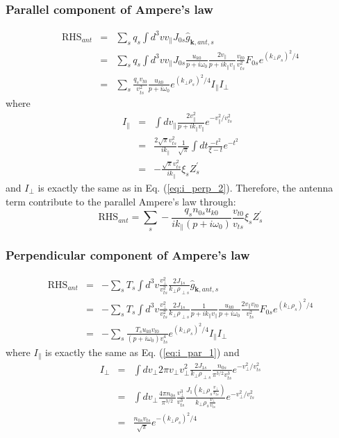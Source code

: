 \documentclass[12pt]{article}
\begin{document}
\subsubsection{Parallel component of Ampere's law}
\begin{eqnarray}
\mathrm{RHS}_{ant} &=& \sum_s q_s \int d^3 v v_\parallel  J_{0s} \hat{g}_{\mathbf{k}, ant, s} \nonumber \\
&=& \sum_s q_s \int d^3 v v_\parallel J_{0s} \frac{u_{k0}}{p + i\omega_0} \frac{2v_\parallel}{p + i k_\parallel v_\parallel} \frac{v_{t0}}{v_{ts}^2} F_{0s} e^{(k_\perp \rho_s)^2/4} \nonumber \\
&=& \sum_s \frac{q_s v_{t0}}{v_{ts}^2} \frac{u_{k0}}{p + i\omega_0} e^{(k_\perp \rho_s)^2/4} I_\parallel I_\perp
\end{eqnarray}
where
\begin{eqnarray}
I_\parallel &=& \int dv_\parallel \frac{2 v_\parallel^2}{p + ik_\parallel v_\parallel} e^{-v_\parallel^2/v_{ts}^2} \nonumber \\
&=& \frac{2\sqrt{\pi}v_{ts}^2}{ik_\parallel} \frac{1}{\sqrt{\pi}}\int dt \frac{-t^2}{\xi-t} e^{-t^2} \nonumber \\
&=& -\frac{\sqrt{\pi}v_{ts}^2}{ik_\parallel} \xi_s Z^\prime_s  
\end{eqnarray}
and $I_\perp$ is exactly the same as in Eq. (\ref{eq:i_perp_2}). Therefore, the antenna term contribute to the parallel Ampere's law through:
\begin{equation}
\mathrm{RHS}_{ant} = \sum_s - \frac{q_s n_{0s} u_{k0}}{ik_\parallel(p + i\omega_0)} \frac{v_{t0}}{v_{ts}} \xi_s Z^\prime_s
\end{equation}

\subsubsection{Perpendicular component of Ampere's law}
\begin{eqnarray}
\mathrm{RHS}_{ant} &=&  -\sum_s T_s \int d^3 v \frac{v_\perp^2}{v_{ts}^2} \frac{2J_{1s}}{k_\perp \rho_{\perp s}} \hat{g}_{\mathbf{k}, ant, s} \nonumber \\
&=& -\sum_s T_s \int d^3 v \frac{v_\perp^2}{v_{ts}^2} \frac{2J_{1s}}{k_\perp \rho_{\perp s}} \frac{1}{p + ik_\parallel v_\parallel} \frac{u_{k0}}{p + i \omega_0} \frac{2 v_\parallel v_{t0}}{v_{ts}^2} F_{0s} e^{(k_\perp \rho_s)^2 / 4} \nonumber \\
&=& - \sum_s \frac{T_s u_{k0} v_{t0}}{(p + i\omega_0) v_{ts}^4} e^{(k_\perp \rho_s)^2/4} I_\parallel I_\perp
\end{eqnarray}
where $I_\parallel$ is exactly the same as Eq. (\ref{eq:i_par_1}) and
\begin{eqnarray}
I_\perp  &=& \int dv_\perp 2\pi v_\perp v_\perp^2 \frac{2J_{1s}}{k_\perp \rho_{\perp s}} \frac{n_{0s}}{\pi^{3/2} v_{ts}^3} e^{-v_\perp^2/v_{ts}^2} \nonumber \\
&=& \int d v_\perp \frac{4\pi n_{0s}}{\pi^{3/2}} \frac{v_\perp^3}{v_{ts}^3} \frac{J_1\left(k_\perp \rho_s \frac{v_\perp}{v_{ts}}\right)}{k_\perp \rho_s \frac{v_\perp}{v_{ts}}} e^{-v_\perp^2/v_{ts}^2} \nonumber \\
&=& \frac{n_{0s}v_{ts}}{\sqrt{\pi}} e^{-(k_\perp \rho_s)^2/4}
\end{eqnarray}
\end{document}
